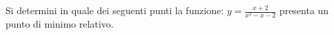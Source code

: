 Si determini in quale dei seguenti punti la funzione:
$y=\frac{x+2}{x^2-x-2}$
presenta un punto di minimo relativo.
